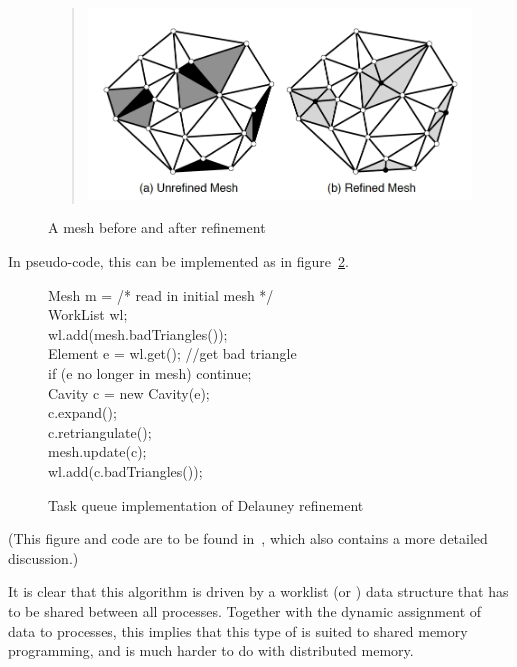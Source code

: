 \begin{figure}[ht]
    \begin{quote}
\includegraphics[scale=.3]{graphics/delauney}
        \end{quote}
  \caption{A mesh before and after refinement}
  \label{fig:delauney}
\end{figure}

In pseudo-code, this can be implemented as in
figure~\ref{fig:delauney-code}.
\begin{figure}
\begin{displayalgorithm}
Mesh m = /* read in initial mesh */ \\
WorkList wl; \\
wl.add(mesh.badTriangles()); \\
 { 
Element e = wl.get(); //get bad triangle \\
if (e no longer in mesh) continue; \\
Cavity c = new Cavity(e); \\
c.expand(); \\
c.retriangulate(); \\
mesh.update(c); \\
wl.add(c.badTriangles()); \\
}
\end{displayalgorithm}
  \caption{Task queue implementation of Delauney refinement}
  \label{fig:delauney-code}
\end{figure}
(This figure and code are to be found in~\cite{Kulkami:howmuch}, 
which also contains a more detailed discussion.)


It is clear that this algorithm is driven by a worklist (or
) data structure
that has to be shared between all processes. Together with the dynamic
assignment of data to processes, this implies that this type of
 is suited to shared memory
programming, and is much harder to do with distributed memory.

